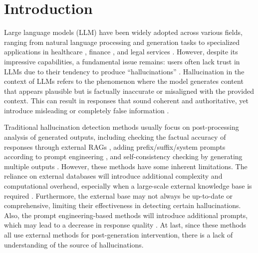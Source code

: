 \section{Introduction}\label{sec:intro}



Large language models (LLM) have been widely adopted across various fields, ranging from natural language processing and generation tasks to specialized applications in healthcare \cite{yang2022large, thirunavukarasu2023large, peng2023study}, finance \cite{wu2023bloomberggpt}, and legal services \cite{cui2023chatlaw, guha2024legalbench}. 
However, despite its impressive capabilities, a fundamental issue remains: users often lack trust in LLMs due to their tendency to produce ``hallucinations'' \cite{huang2023survey, li2024dawn}.
Hallucination in the context of LLMs refers to the phenomenon where the model generates content that appears plausible but is factually inaccurate or misaligned with the provided context. 
This can result in responses that sound coherent and authoritative, yet introduce misleading or completely false information \cite{mckenna2023sources}.


Traditional hallucination detection methods usually focus on post-processing analysis of generated outputs, including checking the factual accuracy of responses through external RAGs \cite{gao2023retrieval, niu2023ragtruth, belyi2024luna, li2024enhancing}, adding prefix/suffix/system prompts according to prompt engineering \cite{hanna2023comparative}, and self-consistency checking by generating multiple outputs \cite{harrington2024mitigating, manakul2023selfcheckgpt, mundler2023self}.
However, these methods have some inherent limitations. The reliance on external databases will introduce additional complexity and computational overhead, especially when a large-scale external knowledge base is required \cite{belyi2024luna}. 
Furthermore, the external base may not always be up-to-date or comprehensive, limiting their effectiveness in detecting certain hallucinations.
Also, the prompt engineering-based methods will introduce additional prompts, which may lead to a decrease in response quality \cite{hanna2023comparative}.
At last, since these methods all use external methods for post-generation intervention, there is a lack of understanding of the source of hallucinations.

